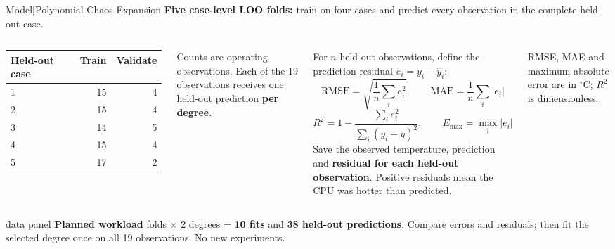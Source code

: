 \begin{frame}{Model\enspace|\enspace Polynomial Chaos Expansion}
  {\footnotesize
  \textbf{Five case-level LOO folds:} train on four cases and predict every observation
  in the complete held-out case.
  }
  \medskip
  \begin{columns}[T,onlytextwidth]
      {\footnotesize
      \renewcommand{\arraystretch}{1.2}
      \begin{tabular*}{\linewidth}{@{\extracolsep{\fill}}lrr@{}}
        \toprule
        \textbf{Held-out case} & \textbf{Train} & \textbf{Validate}\\
        \midrule
        1 & 15 & 4\\
        2 & 15 & 4\\
        3 & 14 & 5\\
        4 & 15 & 4\\
        5 & 17 & 2\\
        \bottomrule
      \end{tabular*}
      \par\medskip
      Counts are operating observations. Each of the 19 observations receives
      one held-out prediction \textbf{per degree}.\par
      }

      \footnotesize
      For $n$ held-out observations, define the prediction residual
      $e_i=y_i-\widehat{y}_i$:
      \[
        \mathrm{RMSE}=\sqrt{\frac{1}{n}\sum_i e_i^2},
        \qquad \mathrm{MAE}=\frac{1}{n}\sum_i |e_i|
      \]
      \[
        R^2=1-\frac{\sum_i e_i^2}{\sum_i(y_i-\overline{y})^2},
        \qquad E_{\max}=\max_i |e_i|
      \]
      Save the observed temperature, prediction and \textbf{residual for each
      held-out observation}. Positive residuals mean the CPU was hotter than predicted.\par
      \smallskip
      RMSE, MAE and maximum absolute error are in ${}^\circ$C; $R^2$ is dimensionless.
  \end{columns}
  \medskip
  \begin{beamercolorbox}[sep=1.5mm,wd=\textwidth]{data panel}
    \footnotesize
    \textbf{Planned workload} folds $\times$ 2 degrees = \textbf{10 fits}
    and \textbf{38 held-out predictions}. Compare errors and residuals;
    then fit the selected degree once on all 19 observations. No new experiments.
  \end{beamercolorbox}
\end{frame}

